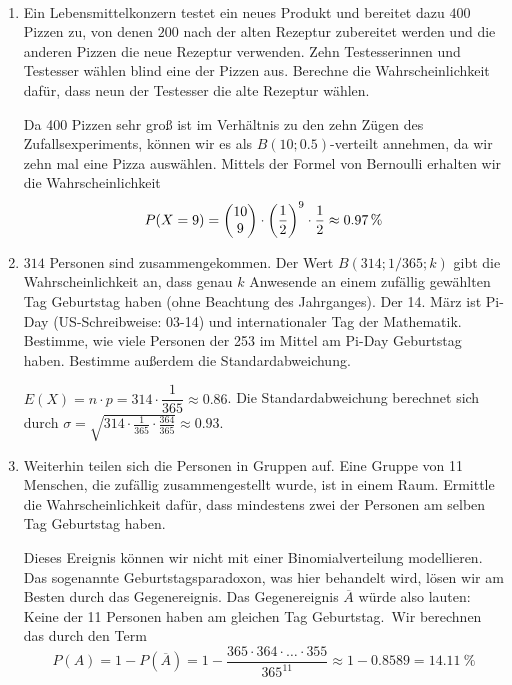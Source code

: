 \documentclass[ngerman, 12pt]{nssheetxea}
\begin{document}
\begin{example} \
\begin{enumerate}
\item Ein Lebensmittelkonzern testet ein neues Produkt und bereitet dazu $400$ Pizzen zu, von denen $200$ nach der alten Rezeptur zubereitet werden und die anderen Pizzen die neue Rezeptur verwenden. Zehn Testesserinnen und Testesser wählen blind eine der Pizzen aus. Berechne die Wahrscheinlichkeit dafür, dass neun der Testesser die alte Rezeptur wählen. \par
Da 400 Pizzen sehr groß ist im Verhältnis zu den zehn Zügen des Zufallsexperiments, können wir es als $B(10;\num{0,5})$-verteilt annehmen, da wir zehn mal eine Pizza auswählen. Mittels der Formel von Bernoulli erhalten wir die Wahrscheinlichkeit
\[ P(X=9) = \colvec{10}{9} \cdot \mleft( \dfrac{1}{2} \mright) ^{9} \cdot \dfrac{1}{2} \approx \SI{0,97}{\percent}\]
\item $314$ Personen sind zusammengekommen. Der Wert $B(314; 1/365; k)$ gibt die Wahrscheinlichkeit an, dass genau $k$ Anwesende an einem zufällig gewählten Tag Geburtstag haben (ohne Beachtung des Jahrganges). Der 14. März ist Pi-Day (US-Schreibweise: 03-14) und internationaler Tag der Mathematik. Bestimme, wie viele Personen der 253 im Mittel am Pi-Day Geburtstag haben. Bestimme außerdem die Standardabweichung. \par
$E(X)=n\cdot p = 314 \cdot \dfrac{1}{365}\approx \num{0,86}$. Die Standardabweichung berechnet sich durch $\sigma=\sqrt{314\cdot \frac{1}{365} \cdot \frac{364}{365}} \approx	\num{0,93}$. 
\item Weiterhin teilen sich die Personen in Gruppen auf. Eine Gruppe von 11 Menschen, die zufällig zusammengestellt wurde, ist in einem Raum. Ermittle die Wahrscheinlichkeit dafür, dass mindestens zwei der Personen am selben Tag Geburtstag haben. \par
Dieses Ereignis können wir nicht mit einer Binomialverteilung modellieren. Das sogenannte Geburtstagsparadoxon, was hier behandelt wird, lösen wir am Besten durch das Gegenereignis. \index{Gegenereignis} Das Gegenereignis $\overline{A}$ würde also lauten: \glqq Keine der 11 Personen haben am gleichen Tag Geburtstag.\grqq \ Wir berechnen das durch den Term
\[ P(A) = 1- P(\overline{A}) = 1 - \dfrac{365 \cdot 364 \cdot \ldots \cdot 355}{365^{11}} \approx 1- \num{0,8589} = \SI{14,11}{\percent} \]

\end{enumerate}

\end{example}
\end{document}
